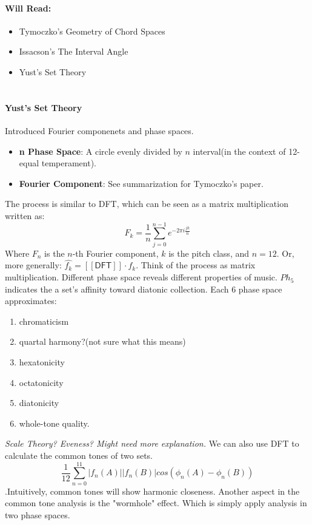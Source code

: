 \documentclass[12pt]{report}
\begin{document}
\paragraph*{Will Read:}
\begin{itemize}
    \item Tymoczko's Geometry of Chord Spaces
    \item Issacson's The Interval Angle
    \item Yust's Set Theory
\end{itemize}

\section*{}
\paragraph*{Yust's Set Theory}
Introduced Fourier componenets and phase spaces. 
\begin{itemize}
    \item \textbf{n Phase Space}: A circle evenly divided by $n$ interval(in the context of 12-equal temperament).
    \item \textbf{Fourier Component}: See summarization for Tymoczko's paper.
\end{itemize}
The process is similar to DFT, which can be seen as a matrix multiplication written as:
\[F_k=\frac{1}{n}\sum_{j=0}^{n-1}e^{-2\pi i\frac{jk}{n}}\]
Where $F_n$ is the $n$-th Fourier component, $k$ is the pitch class, and $n=12$. Or, more generally:
$\hat{f_k}=[[\mathsf{DFT}]]\cdot f_k$. Think of the process as matrix multiplication.
Different phase space reveals different properties of music. $Ph_5$ indicates 
the a set's affinity toward diatonic collection. Each $6$ phase space approximates:
\begin{enumerate}
    \item chromaticism
    \item quartal harmony?(not sure what this means)
    \item hexatonicity
    \item octatonicity
    \item diatonicity
    \item whole-tone quality.
\end{enumerate}
\emph{Scale Theory? Eveness? Might need more explanation.}
We can also use DFT to calculate the common tones of two sets. 
\[\frac{1}{12}\sum_{n=0}^{11}|f_n(A)||f_n(B)|cos(\phi_n(A)-\phi_n(B))\].Intuitively,
common tones will show harmonic closeness. Another aspect in the common tone analysis
is the "wormhole" effect. Which is simply apply analysis in two phase spaces.
\end{document}
